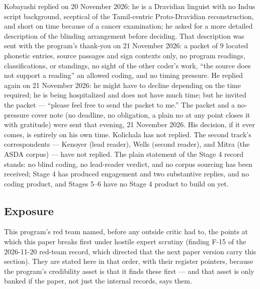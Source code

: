 \documentclass[11pt]{article}
\begin{document}
Kobayashi replied on 20 November 2026: he is a Dravidian
linguist with no Indus script background, sceptical of the
Tamil-centric Proto-Dravidian reconstruction, and short on time
because of a cancer examination; he asked for a more detailed
description of the blinding arrangement before deciding. That
description was sent with the program's thank-you on 21 November
2026: a packet of 9 located phonetic entries, source passages
and sign contexts only, no program readings, classifications, or
standings, no sight of the other coder's work, ``the source does
not support a reading'' an allowed coding, and no timing
pressure. He replied again on 21 November 2026: he might have to
decline depending on the time required; he is being hospitalized
and does not have much time; but he invited the packet ---
``please feel free to send the packet to me.'' The packet and a
no-pressure cover note (no deadline, no obligation, a plain no
at any point closes it with gratitude) were sent that evening,
21 November 2026. His decision, if it ever comes, is entirely on
his own time. Kolichala has not replied. The second track's
correspondents --- Kenoyer (lead reader), Wells (second reader),
and Mitra (the ASDA corpus) --- have not replied. The plain
statement of the Stage 4 record stands: no blind coding, no
lead-reader verdict, and no corpus sourcing has been received;
Stage 4 has produced engagement and two substantive replies, and
no coding product, and Stages 5--6 have no Stage 4 product to
build on yet.

\subsection{Exposure}\label{appendix-d12-exposure}

This program's red team named, before any outside critic had to,
the points at which this paper breaks first under hostile expert
scrutiny (finding F-15 of the 2026-11-20 red-team record, which
directed that the next paper version carry this section). They
are stated here in that order, with their register pointers,
because the program's credibility asset is that it finds these
first --- and that asset is only banked if the paper, not just
the internal records, says them.
\end{document}
